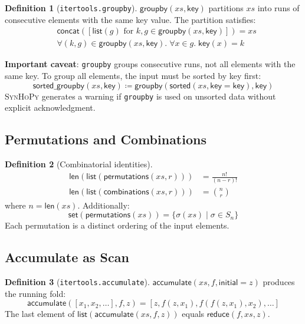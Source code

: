 \documentclass[11pt,a4paper]{report}
\theoremstyle{definition}
\newtheorem{definition}{Definition}[chapter]
\theoremstyle{plain}
\newcommand{\defeq}{\coloneqq}
\newcommand{\synhopy}{\textsc{SynHoPy}}
\begin{document}
\begin{definition}[\texttt{itertools.groupby}]
$\mathsf{groupby}(xs, \mathsf{key})$ partitions $xs$ into runs of consecutive elements
with the same key value.  The partition satisfies:
\begin{align}
  &\mathsf{concat}([\mathsf{list}(g) \text{ for } k, g \in \mathsf{groupby}(xs, \mathsf{key})]) = xs \\
  &\forall (k, g) \in \mathsf{groupby}(xs, \mathsf{key}).\; \forall x \in g.\; \mathsf{key}(x) = k
\end{align}

\textbf{Important caveat}: \lstinline[style=python]{groupby} groups consecutive runs,
not all elements with the same key.  To group all elements, the input must be
sorted by key first:
\[
  \mathsf{sorted\_groupby}(xs, \mathsf{key}) \defeq \mathsf{groupby}(\mathsf{sorted}(xs, \mathsf{key}=\mathsf{key}), \mathsf{key})
\]
\synhopy{} generates a warning if \lstinline[style=python]{groupby} is used on
unsorted data without explicit acknowledgment.
\end{definition}

\subsection{Permutations and Combinations}

\begin{definition}[Combinatorial identities]
\begin{align}
  \mathsf{len}(\mathsf{list}(\mathsf{permutations}(xs, r))) &= \frac{n!}{(n-r)!} \\
  \mathsf{len}(\mathsf{list}(\mathsf{combinations}(xs, r))) &= \binom{n}{r}
\end{align}
where $n = \mathsf{len}(xs)$.  Additionally:
\[
  \mathsf{set}(\mathsf{permutations}(xs)) = \{ \sigma(xs) \mid \sigma \in S_n \}
\]
Each permutation is a distinct ordering of the input elements.
\end{definition}

\subsection{Accumulate as Scan}

\begin{definition}[\texttt{itertools.accumulate}]
$\mathsf{accumulate}(xs, f, \mathsf{initial}=z)$ produces the running fold:
\[
  \mathsf{accumulate}([x_1, x_2, \ldots], f, z) = [z, f(z, x_1), f(f(z, x_1), x_2), \ldots]
\]
The last element of $\mathsf{list}(\mathsf{accumulate}(xs, f, z))$ equals
$\mathsf{reduce}(f, xs, z)$.
\end{definition}
\end{document}
